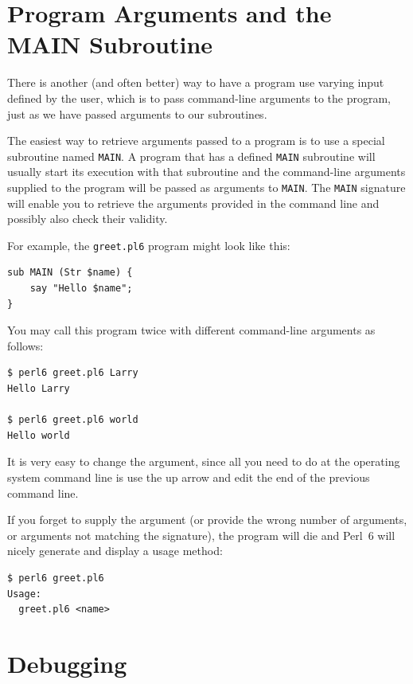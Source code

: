 \section{Program Arguments and the MAIN Subroutine}
\label{MAIN}

There is another (and often better) way to have a program 
use varying input defined by the user, which is to pass 
command-line arguments to the program, just as we have 
passed arguments to our subroutines.

The easiest way to retrieve arguments passed to a program is 
to use a special subroutine named \verb'MAIN'. A program that 
has a defined \verb'MAIN' subroutine will usually start its execution 
with that subroutine and the command-line arguments supplied 
to the program will be passed as arguments to \verb'MAIN'. 
The \verb'MAIN' signature will enable you to 
retrieve the arguments provided in the command line and 
possibly also check their validity.

For example, the {\tt greet.pl6} program might look like 
this:
\begin{verbatim}
sub MAIN (Str $name) {
    say "Hello $name";
}
\end{verbatim}

You may call this program twice with different command-line 
arguments as follows:

\begin{verbatim}
$ perl6 greet.pl6 Larry
Hello Larry

$ perl6 greet.pl6 world
Hello world
\end{verbatim}

It is very easy to change the argument, since all you need 
to do at the operating system command line is use the up arrow 
and edit the end of the previous command line.

If you forget to supply the argument (or provide the wrong 
number of arguments, or arguments not matching the signature), 
the program will die and Perl~6 will nicely generate and 
display a usage method:

\begin{verbatim}
$ perl6 greet.pl6
Usage:
  greet.pl6 <name>
\end{verbatim}


\section{Debugging}
\label{whitespace}

